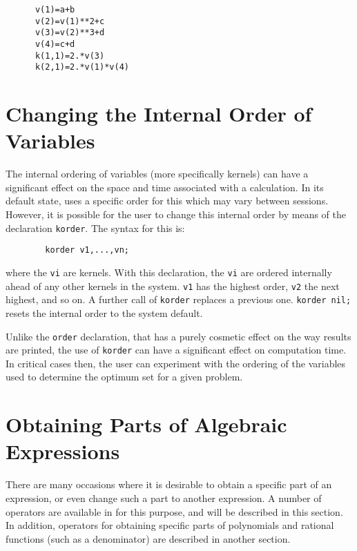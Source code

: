 \begin{verbatim}
      v(1)=a+b
      v(2)=v(1)**2+c
      v(3)=v(2)**3+d
      v(4)=c+d
      k(1,1)=2.*v(3)
      k(2,1)=2.*v(1)*v(4)
\end{verbatim}

\section{Changing the Internal Order of Variables}
\hypertarget{command:KORDER}{}

The internal ordering of variables (more specifically kernels) can have
a significant effect on the space and time associated with a calculation.
In its default state, {\REDUCE} uses a specific order for this which may
vary between sessions.  However, it is possible for the user to change
this internal order by means of the declaration
\texttt{korder}.
The syntax for this is:
\begin{verbatim}
        korder v1,...,vn;
\end{verbatim}
where the \texttt{vi} are kernels.  With this declaration, the
\texttt{vi} are ordered internally ahead of any other kernels in the system.
\texttt{v1} has the highest order, \texttt{v2} the next highest, and so on.  A
further call of \texttt{korder} replaces a previous one. \texttt{korder nil;}
resets the internal order to the system default.

Unlike the \texttt{order}
declaration, that has a purely
cosmetic effect on the way results are printed, the use of \texttt{korder}
can have a significant effect on computation time.  In critical cases
then, the user can experiment with the ordering of the variables used to
determine the optimum set for a given problem.

\section{Obtaining Parts of Algebraic Expressions}

There are many occasions where it is desirable to obtain a specific part
of an expression, or even change such a part to another expression. A
number of operators are available in {\REDUCE} for this purpose, and will be
described in this section. In addition, operators for obtaining specific
parts of polynomials and rational functions (such as a denominator) are
described in another section.

